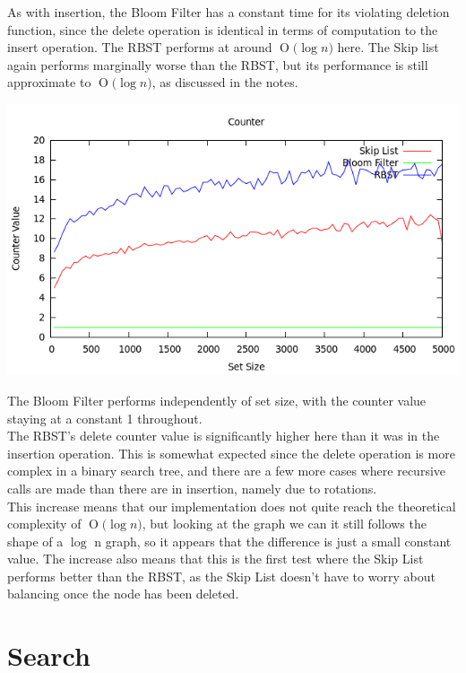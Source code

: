 \documentclass[11pt, notitlepage]{report}
\newcommand{\BigO}[1]{\ensuremath{\operatorname{O}\bigl(#1\bigr)}}
\begin{document}
As with insertion, the Bloom Filter has a constant time for its violating deletion function, since the delete operation is identical in terms of computation to the insert operation. The RBST performs at around \BigO{\log n} here. The Skip list again performs marginally worse than the RBST, but its performance is still approximate to \BigO{\log n}, as discussed in the notes.

\includegraphics[width=\linewidth]{img/Counter-Del}

The Bloom Filter performs independently of set size, with the counter value staying at a constant 1 throughout.\\

The RBST's delete counter value is significantly higher here than it was in the insertion operation. This is somewhat expected since the delete operation is more complex in a binary search tree, and there are a few more cases where recursive calls are made than there are in insertion, namely due to rotations.\\

This increase means that our implementation does not quite reach the theoretical complexity of \BigO{\log n}, but looking at the graph we can it still follows the shape of a $\log$ n graph, so it appears that the difference is just a small constant value. The increase also means that this is the first test where the Skip List performs better than the RBST, as the Skip List doesn't have to worry about balancing once the node has been deleted.\\

\section*{Search}
\end{document}
